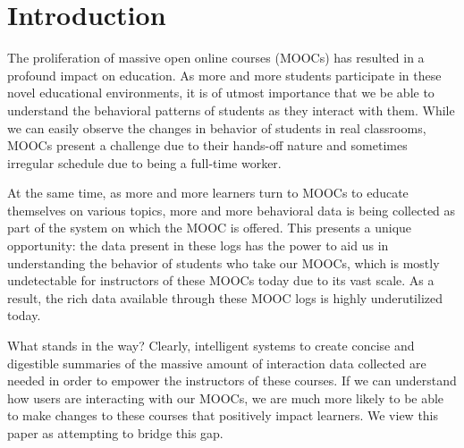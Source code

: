 \section{Introduction}

The proliferation of massive open online courses (MOOCs) has resulted in a
profound impact on education. As more and more students participate in
these novel educational environments, it is of utmost importance that we be
able to understand the behavioral patterns of students as they interact
with them. While we can easily observe the changes in behavior of students
in real classrooms, MOOCs present a challenge due to their hands-off nature
and sometimes irregular schedule due to being a full-time worker.

At the same time, as more and more learners turn to MOOCs to educate
themselves on various topics, more and more behavioral data is being
collected as part of the system on which the MOOC is offered. This
presents a unique opportunity: the data present in these logs has the power
to aid us in understanding the behavior of students who take our MOOCs,
which is mostly undetectable for instructors of these MOOCs today due to
its vast scale. As a result, the rich data available through these MOOC
logs is highly underutilized today.

What stands in the way? Clearly, intelligent systems to create concise and
digestible summaries of the massive amount of interaction data collected
are needed in order to empower the instructors of these courses. If we can
understand how users are interacting with our MOOCs, we are much more
likely to be able to make changes to these courses that positively impact
learners. We view this paper as attempting to bridge this gap.

